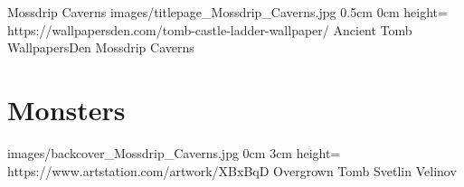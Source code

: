 \documentclass[letterpaper,openany,twoside,twocolumn]{book}
\begin{document}
	\regionTitlePage
		{Mossdrip Caverns}
		{images/titlepage_Mossdrip_Caverns.jpg}
		{0.5cm}
		{0cm}
		{height=\paperheight}
		{https://wallpapersden.com/tomb-castle-ladder-wallpaper/}
		{Ancient Tomb}
		{WallpapersDen}
		{Mossdrip Caverns}
	
	\tableofcontents
	
	\mainmatter
	
	\MonsterSheetGeometry
	\part{Monsters}
	
	
	\bookLastPage
		{images/backcover_Mossdrip_Caverns.jpg}
		{0cm}
		{3cm}
		{height=\paperheight}
		{https://www.artstation.com/artwork/XBxBqD}
		{Overgrown Tomb}
		{Svetlin Velinov}
		{}
\end{document}
